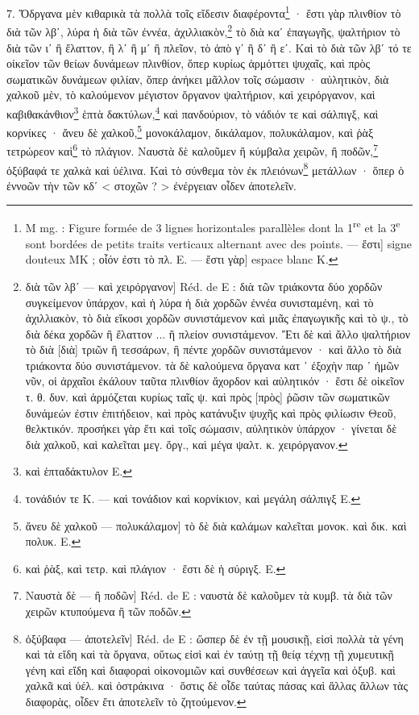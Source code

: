 \documentclass[a4paper, 11pt, oneside, polutonikogreek, french]{article}
\begin{document}
7. Ὄδργανα μὲν κιθαρικὰ τὰ πολλὰ τοῖς εἴδεσιν διαφέροντα\footnote{M mg. : Figure formée de 3 lignes horizontales parallèles dont la 1\textsuperscript{re} et la 3\textsuperscript{e} sont bordées de petits traits verticaux alternant avec des points. --- ἔστι] signe douteux MK ; οἷόν ἐστι τὸ πλ. E. --- ἔστι γὰρ] espace blanc K.} · ἔστι γὰρ πλινθίον τὸ διὰ τῶν λβʹ, λύρα ἡ διὰ τῶν ἐννέα, ἀχιλλιακὸν,\footnote{διὰ τῶν λβʹ --- καὶ χειρόργανον] Réd. de E : διὰ τῶν τριάκοντα δύο χορδῶν συγκείμενον ὑπάρχον, καὶ ἡ λύρα ἡ διὰ χορδῶν ἐννέα συνισταμένη, καὶ τὸ ἀχιλλιακὸν, τὸ διὰ εἴκοσι χορδῶν συνιστάμενον καὶ μιᾶς ἐπαγωγικῆς καὶ τὸ ψ., τὸ διὰ δέκα χορδῶν ἢ ἔλαττον ... ἢ πλείον συνιστάμενον. Ἔτι δὲ καὶ ἄλλο ψαλτήριον τὸ διὰ [διὰ] τριῶν ἢ τεσσάρων, ἢ πέντε χορδῶν συνιστάμενον · καὶ ἄλλο τὸ διὰ τριάκοντα δύο συνιστάμενον. τὰ δὲ καλούμενα ὄργανα κατ ᾽ ἐξοχὴν παρ ᾽ ἡμῶν νῦν, οἱ ἀρχαῖοι ἐκάλουν ταῦτα πλινθίον ἄχορδον καὶ αὐλητικόν · ἔστι δὲ οἰκεῖον τ. θ. δυν. καὶ ἁρμόζεται κυρίως ταῖς ψ. καὶ πρὸς [πρὸς] ῥῶσιν τῶν σωματικῶν δυνάμεών ἐστιν ἐπιτήδειον, καὶ πρὸς κατάνυξιν ψυχῆς καὶ πρὸς φιλίωσιν Θεοῦ, θελκτικόν. προσήκει γὰρ ἔτι καὶ τοῖς σώμασιν, αὐλητικὸν ὑπάρχον · γίνεται δὲ διὰ χαλκοῦ, καὶ καλεῖται μεγ. ὄργ., καὶ μέγα ψαλτ. κ. χειρόργανον.} τὸ διὰ καʹ ἐπαγωγῆς, ψαλτήριον τὸ διὰ τῶν ιʹ ἢ ἔλαττον, ἢ λʹ ἣ μʹ ἢ πλεῖον, τὸ ἀπὸ γʹ ἢ δʹ ἢ εʹ. Καὶ τὸ διὰ τῶν λβʹ τό τε οἰκεῖον τῶν θείων δυνάμεων πλινθίον, ὅπερ κυρίως ἁρμόττει ψυχαῖς, καὶ πρὸς σωματικῶν δυνάμεων φιλίαν, ὅπερ ἀνήκει μᾶλλον τοῖς σώμασιν · αὐλητικὸν, διὰ χαλκοῦ μὲν, τὸ καλούμενον μέγιστον ὄργανον ψαλτήριον, καὶ χειρόργανον, καὶ καβιθακάνθιον\footnote{καὶ ἑπταδάκτυλον E.} ἑπτὰ δακτύλων,\footnote{τονάδιόν τε K. --- καὶ τονάδιον καὶ κορνίκιον, καὶ μεγάλη σάλπιγξ E.} καὶ πανδούριον, τὸ νάδιόν τε καὶ σάλπιγξ, καὶ κορνίκες · ἄνευ δὲ χαλκοῦ,\footnote{ἄνευ δὲ χαλκοῦ --- πολυκάλαμον] τὸ δὲ διὰ καλάμων καλεῖται μονοκ. καὶ δικ. καὶ πολυκ. E.} μονοκάλαμον, δικάλαμον, πολυκάλαμον, καὶ ῥὰξ τετρώρεον καὶ\footnote{καὶ ῥὰξ, καὶ τετρ. καὶ πλάγιον · ἔστι δὲ ἡ σύριγξ. E.} τὸ πλάγιον. Ναυστὰ δὲ καλοῦμεν ἢ κύμβαλα χειρῶν, ἢ ποδῶν,\footnote{Ναυστὰ δὲ --- ἢ ποδῶν] Réd. de E : ναυστὰ δὲ καλοῦμεν τὰ κυμβ. τὰ διὰ τῶν χειρῶν κτυπούμενα ἢ τῶν ποδῶν.} ὀξύβαφά τε χαλκὰ καὶ ὑέλινα. Καὶ τὸ σύνθεμα τὸν ἐκ πλειόνων\footnote{ὀξύβαφα --- ἀποτελεῖν] Réd. de E : ὥσπερ δὲ ἐν τῇ μουσικῇ, εἰσὶ πολλὰ τὰ γένη καὶ τὰ εἴδη καὶ τὰ ὄργανα, οὕτως εἰσὶ καὶ ἐν ταύτῃ τῇ θείᾳ τέχνῃ τῇ χυμευτικῇ γένη καὶ εἴδη καὶ διαφοραὶ οἰκονομιῶν καὶ συνθέσεων καὶ ἀγγεῖα καὶ ὀξυβ. καὶ χαλκᾶ καὶ ὑέλ. καὶ ὀστράκινα · ὅστις δὲ οἶδε ταύτας πάσας καὶ ἄλλας ἄλλων τὰς διαφορὰς, οἶδεν ἔτι ἀποτελεῖν τὸ ζητούμενον.} μετάλλων · ὅπερ ὁ ἐννοῶν τὴν τῶν κδʹ < στοχῶν ? > ἐνέργειαν οἶδεν ἀποτελεῖν.
\end{document}
